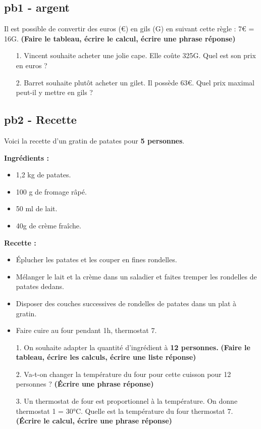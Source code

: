 \subsection*{pb1 - argent}
Il est possible de convertir des euros (€) en gils (G) en suivant cette règle : 7€ = 16G.
\textbf{(Faire le tableau, écrire le calcul, écrire une phrase réponse)}

\begin{enumerate}
  \item[1.] Vincent souhaite acheter une jolie cape. Elle coûte 325G. Quel est son prix en euros ? 
  \item[2.] Barret souhaite plutôt acheter un gilet. Il possède 63€. Quel prix maximal peut-il y mettre en gils ?
\end{enumerate}

\subsection*{pb2 - Recette}
Voici la recette d'un gratin de patates pour \textbf{5 personnes}. 

\begin{minipage}[t]{0.45\textwidth}
  \textbf{Ingrédients : }
  \begin{itemize}
    \item 1,2 kg de patates.
    \item 100 g de fromage râpé.
    \item 50 ml de lait.
    \item 40g de crème fraîche.
  \end{itemize}

\end{minipage}
\begin{minipage}[t]{0.5\textwidth}
  \textbf{Recette :}
  \begin{itemize}
    \item Éplucher les patates et les couper en fines rondelles.
    \item Mélanger le lait et la crème dans un saladier et faites tremper les rondelles de patates dedans.
    \item Disposer des couches successives de rondelles de patates dans un plat à gratin. 
    \item Faire cuire au four pendant 1h, thermostat 7.
  \end{itemize}
\end{minipage}

\begin{enumerate}
  \item[1.] On souhaite adapter la quantité d'ingrédient à \textbf{12 personnes.} \textbf{(Faire le tableau, écrire les calculs, écrire une liste réponse)}
  \item[2.] Va-t-on changer la température du four pour cette cuisson pour 12 personnes ?  \textbf{(Écrire une phrase réponse)}
  \item[3.] Un thermostat de four est proportionnel à la température. On donne thermostat 1 = 30°C. Quelle est la température du four thermostat 7. \textbf{(Écrire le calcul, écrire une phrase réponse)} 
\end{enumerate}

